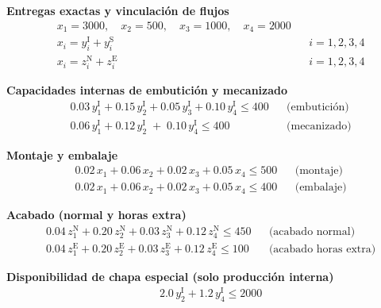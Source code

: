 \textbf{Entregas exactas y vinculación de flujos}\\[0.2cm]
\begin{align}
& x_1 = 3000, \quad x_2 = 500, \quad x_3 = 1000, \quad x_4 = 2000 \\
& x_i = y_i^{\mathrm{I}} + y_i^{\mathrm{S}} && i=1,2,3,4 \\
& x_i = z_i^{\mathrm{N}} + z_i^{\mathrm{E}} && i=1,2,3,4
\end{align}

\textbf{Capacidades internas de embutición y mecanizado}\\[0.2cm]
\begin{align}
& 0.03\,y_1^{\mathrm{I}} + 0.15\,y_2^{\mathrm{I}} + 0.05\,y_3^{\mathrm{I}} + 0.10\,y_4^{\mathrm{I}} \le 400
&& \text{(embutición)} \\
& 0.06\,y_1^{\mathrm{I}} + 0.12\,y_2^{\mathrm{I}} \;+\; 0.10\,y_4^{\mathrm{I}} \le 400
&& \text{(mecanizado)}
\end{align}

\textbf{Montaje y embalaje}\\[0.2cm]
\begin{align}
& 0.02\,x_1 + 0.06\,x_2 + 0.02\,x_3 + 0.05\,x_4 \le 500
&& \text{(montaje)} \\
& 0.02\,x_1 + 0.06\,x_2 + 0.02\,x_3 + 0.05\,x_4 \le 400
&& \text{(embalaje)}
\end{align}

\textbf{Acabado (normal y horas extra)}\\[0.2cm]
\begin{align}
& 0.04\,z_1^{\mathrm{N}} + 0.20\,z_2^{\mathrm{N}} + 0.03\,z_3^{\mathrm{N}} + 0.12\,z_4^{\mathrm{N}} \le 450
&& \text{(acabado normal)} \\
& 0.04\,z_1^{\mathrm{E}} + 0.20\,z_2^{\mathrm{E}} + 0.03\,z_3^{\mathrm{E}} + 0.12\,z_4^{\mathrm{E}} \le 100
&& \text{(acabado horas extra)}
\end{align}

\textbf{Disponibilidad de chapa especial (solo producción interna)}\\[0.2cm]
\begin{align}
& 2.0\,y_2^{\mathrm{I}} + 1.2\,y_4^{\mathrm{I}} \le 2000
\end{align}


